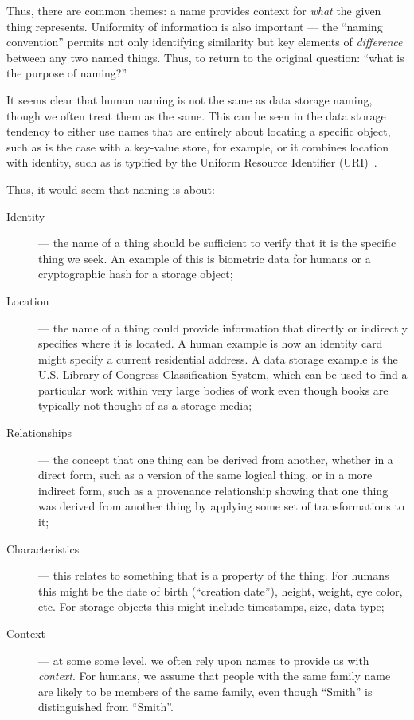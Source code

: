 Thus, there are common themes: a name provides context for \emph{what} the given
thing represents. Uniformity of information is also important --- the ``naming
convention'' permits not only identifying similarity but key elements of
\emph{difference} between any two named things.  Thus, to return to the original
question: ``what is the purpose of naming?''


It seems clear that human naming is
not the same as data storage naming, though we often treat them as the
same.  This can be seen in the data storage tendency to either use names that
are entirely about locating a specific object, such as is the case with a
key-value store, for example, or it combines location with identity, such as is
typified by the Uniform Resource Identifier (URI)~\cite{berners-lee1998uniform}.

Thus, it would seem that naming is about:

\begin{description}
    \item[Identity] --- the name of a thing should be sufficient to verify that
        it is the specific thing we seek.  An example of this is biometric data for
        humans or a cryptographic hash for a storage object;
    \item[Location] --- the name of a thing could provide information that
        directly or indirectly specifies where it is located.  A human example is
        how an identity card might specify a current residential address.  A data
        storage example is the U.S. Library of Congress Classification System, which
        can be used to find a particular work within very large bodies of work even
        though books are typically not thought of as a storage media;
    \item[Relationships]  --- the concept that one thing can be derived from
        another, whether in a direct form, such as a version of the same logical
        thing, or in a more indirect form, such as a provenance relationship showing
        that one thing was derived from another thing by applying some set of
        transformations to it;
    \item[Characteristics] --- this relates to something that is a property of
        the thing.  For humans this might be the date of birth (``creation date''),
        height, weight, eye color, etc.  For storage objects this might include
        timestamps, size, data type;
    \item[Context] --- at some some level, we often rely upon names to provide
        us with \emph{context}.  For humans, we assume that people with the same
        family name are likely to be members of the same family, even though
        ``\persa Smith'' is distinguished from ``\persb Smith''.
\end{description}

